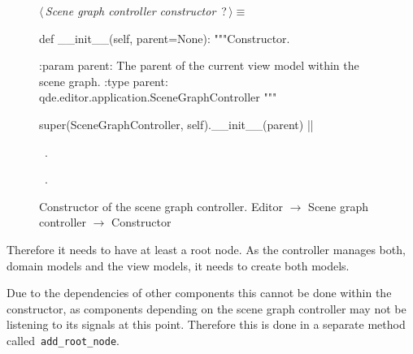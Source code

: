 \documentclass[%
    a4paper,    %
    justified,  %
    nobib,      %
    openany     %
]{tufte-book}
\begin{document}
\begin{figure}
\begin{flushleft} \small
\begin{minipage}{\linewidth}\label{scrap26}\raggedright\small
{} $\langle\,${\itshape Scene graph controller constructor}\nobreak\ {\footnotesize {?}}$\,\rangle\equiv$
\vspace{-1ex}
\begin{pythoncode}
def __init__(self, parent=None):
    """Constructor.

    :param parent: The parent of the current view model within
                    the scene graph.
    :type parent:  qde.editor.application.SceneGraphController
    """

    super(SceneGraphController, self).__init__(parent)
|\NWsep|
\end{pythoncode}
\vspace{1.5ex}
\footnotesize
\begin{list}{}{\setlength{\itemsep}{-\parsep}\setlength{\itemindent}{-\leftmargin}}
\item \NWtxtMacroDefBy\ .
\item \NWtxtMacroRefIn\ .

\item{}
\end{list}
\end{minipage}\vspace{4ex}
\end{flushleft}
\caption{Constructor of the scene graph controller.
  \newline{}\newline{}Editor $\rightarrow$ Scene graph controller $\rightarrow$
  Constructor}
\label{editor:lst:scene-graph-controller:constructor}
\end{figure}

 Therefore
it needs to have at least a root node. As the controller manages both, domain
models and the view models, it needs to create both models.

Due to the dependencies of other components this cannot be done within the
constructor, as components depending on the scene graph controller may not be
listening to its signals at this point. Therefore this is done in a separate
method called~\verb=add_root_node=.
\end{document}
